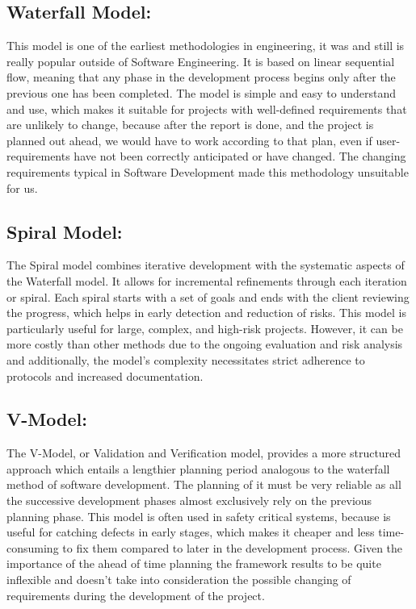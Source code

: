 \documentclass[12pt]{report}
\begin{document}
\subsection*{Waterfall Model:}
This model is one of the earliest methodologies in engineering, it was and still is really popular outside of Software Engineering. It is based on linear sequential flow, meaning that any phase in the development process begins only after the previous one has been completed. The model is simple and easy to understand and use, which makes it suitable for projects with well-defined requirements that are unlikely to change, because after the report is done, and the project is planned out ahead, we would have to work according to that plan, even if user-requirements have not been correctly anticipated or have changed. The changing requirements typical in Software Development made this methodology unsuitable for us. 

\subsection*{Spiral Model:} 
The Spiral model combines iterative development with the systematic aspects of the Waterfall model. It allows for incremental refinements through each iteration or spiral. Each spiral starts with a set of goals and ends with the client reviewing the progress, which helps in early detection and reduction of risks. This model is particularly useful for large, complex, and high-risk projects. However, it can be more costly than other methods due to the ongoing evaluation and risk analysis and additionally, the model's complexity necessitates strict adherence to protocols and increased documentation.

\subsection*{V-Model:} 
The V-Model, or Validation and Verification model, provides a more structured approach which entails a lengthier planning period analogous to the waterfall method of software development. The planning of it must be very reliable as all the successive development phases almost exclusively rely on the previous planning phase. This model is often used in safety critical systems, because is useful for catching defects in early stages, which makes it cheaper and less time-consuming to fix them compared to later in the development process. Given the importance of the ahead of time planning the framework results to be quite inflexible and doesn't take into consideration the possible changing of requirements during the development of the project.
\end{document}
